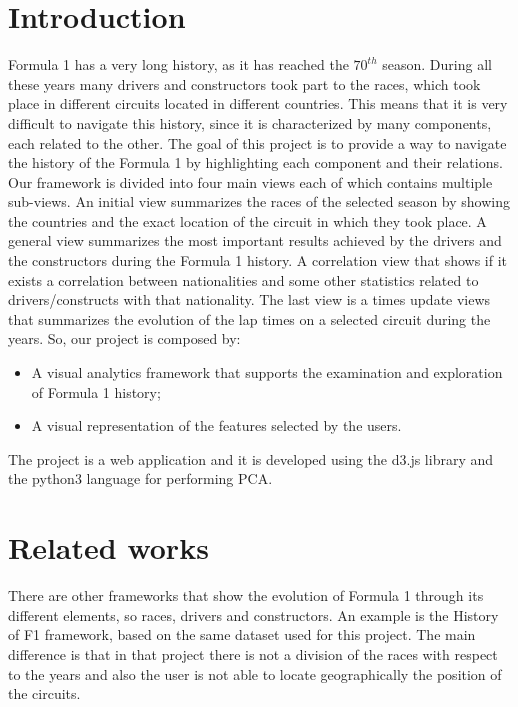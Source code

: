 \documentclass[10pt,twocolumn,letterpaper]{article}
\begin{document}
\section{Introduction}
Formula 1 has a very long history, as it has reached the $70^{th}$ season. During all these years many drivers and constructors took part to the races, which took
place in different circuits located in different countries. This means that it is very difficult to navigate this history, since it is characterized by many components,
each related to the other. The goal of this project is to provide a way to navigate the history of the Formula 1 by highlighting each component and their relations.
Our framework is divided into four main views each of which contains multiple sub-views. An initial view summarizes the races of the selected season by showing
the countries and the exact location of the circuit in which they took place. A general view summarizes the most important results achieved by the drivers and the
constructors during the Formula 1 history. A correlation view that shows if it exists a correlation between nationalities and some other statistics related to 
drivers/constructs with that nationality.
The last view is a times update views that summarizes the evolution of the lap times on a selected circuit during the years. So, our project is composed by:
\begin{itemize}
	\item A visual analytics framework that supports the examination and exploration of Formula 1 history;
	\item A visual representation of the features selected by the users.
\end{itemize}
The project is a web application and it is developed using the d3.js \cite{D3} library and the python3 language for performing PCA.

\section{Related works}
There are other frameworks that show the evolution of Formula 1 through its different elements, so races, drivers and constructors. An example is the History of F1
\cite{HistoryOfF1} framework, based on the same dataset used for this project. The main difference is that in that project
there is not a division of the races with respect to the years and also the user is not able to locate geographically the position of the circuits. 
\end{document}
